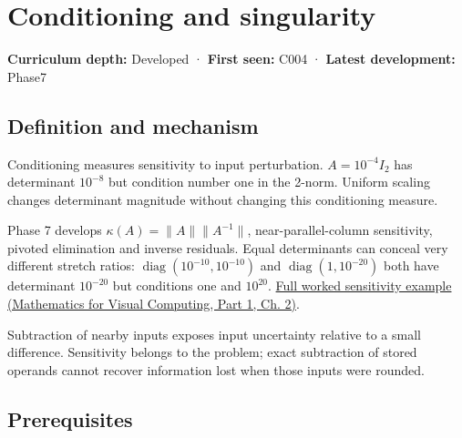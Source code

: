 \hypertarget{appendix-8f6a01f284a7}{}\label{referencestart:appendix-8f6a01f284a7}
\section{Conditioning and singularity}\label{appendix-8f6a01f284a7-conditioning-and-singularity}

\hypertarget{appendix-8f6a01f284a7-conditioning-and-singularity}{}

\textbf{Curriculum depth:} Developed · \textbf{First seen:} C004 · \textbf{Latest development:} Phase7

\begin{allmightroledefinition}

\subsection{Definition and mechanism}\label{appendix-8f6a01f284a7-definition-and-mechanism}

\hypertarget{appendix-8f6a01f284a7-definition-and-mechanism}{}

Conditioning measures sensitivity to input perturbation. \(A=10^{-4}I_2\) has determinant \(10^{-8}\) but condition number one in the 2-norm. Uniform scaling changes determinant magnitude without changing this conditioning measure.

\end{allmightroledefinition}

Phase 7 develops \(\kappa(A)=\|A\|\|A^{-1}\|\), near-parallel-column sensitivity, pivoted elimination and inverse residuals. Equal determinants can conceal very different stretch ratios: \(\operatorname{diag}(10^{-10},10^{-10})\) and \(\operatorname{diag}(1,10^{-20})\) both have determinant \(10^{-20}\) but conditions one and \(10^{20}\). \href{../02-Mathematics-for-Visual-Computing-P01/main.pdf\#01-foundations-i-ch018-an-inverse-can-exist-and-still-amplify-uncertainty}{Full worked sensitivity example (Mathematics for Visual Computing, Part 1, Ch. 2)}.

Subtraction of nearby inputs exposes input uncertainty relative to a small difference. Sensitivity belongs to the problem; exact subtraction of stored operands cannot recover information lost when those inputs were rounded.

\subsection{Prerequisites}\label{appendix-8f6a01f284a7-prerequisites}

